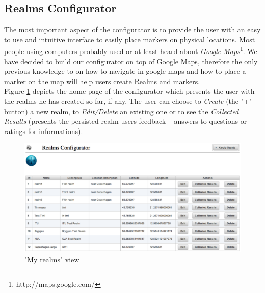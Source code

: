\subsection{Realms Configurator}
\noindent The most important aspect of the configurator is to provide the user with an easy to use and intuitive interface to easily place markers on physical locations. Most people using computers probably used or at least heard about \emph{Google Maps}\footnote{http://maps.google.com/}. We have decided to build our configurator on top of Google Maps, therefore the only previous knowledge to on how to navigate in google maps and how to place a marker on the map will help users create Realms and markers.
\\

\noindent Figure \ref{fig.my_realms} depicts the home page of the configurator which presents the user with the realms he has created so far, if any. The user can choose to \emph{Create} (the "+" button) a new realm, to \emph{Edit/Delete} an existing one or to see the \emph{Collected Results} (presents the persisted realm users feedback -- answers to questions or ratings for informations).
\\

\begin{figure}[H] 
	\centering
	\includegraphics[width=\linewidth]{fig/my_realms.png}
	\caption{"My realms" view}
	\label{fig.my_realms}
\end{figure}

